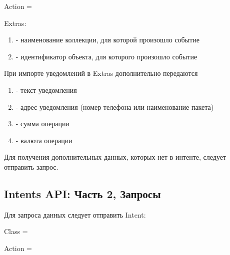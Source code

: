 \documentclass[a4paper,10pt,russian]{sphinxmanual}
\begin{document}
Action = 

Extras:
\begin{enumerate}
\def\theenumi{\arabic{enumi}}
\def\labelenumi{\theenumi .}
\makeatletter\def\p@enumii{\p@enumi \theenumi .}\makeatother
\item {} 
 - наименование коллекции, для которой произошло событие

\item {} 
 - идентификатор объекта, для которого произошло событие

\end{enumerate}

При импорте уведомлений в Extras дополнительно передаются
\begin{enumerate}
\def\theenumi{\arabic{enumi}}
\def\labelenumi{\theenumi .}
\makeatletter\def\p@enumii{\p@enumi \theenumi .}\makeatother
\item {} 
 - текст уведомления

\item {} 
 - адрес уведомления (номер телефона или наименование пакета)

\item {} 
 - сумма операции

\item {} 
 - валюта операции

\end{enumerate}

Для получения дополнительных данных, которых нет в интенте, следует отправить запрос.


\subsection{Intents API: Часть 2, Запросы}
\label{\detokenize{api:intents-api-2}}
Для запроса данных следует отправить Intent:

Class = 

Action = 
\end{document}
